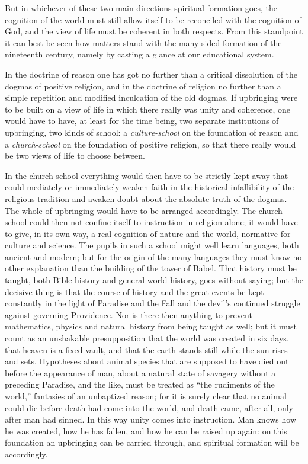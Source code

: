\documentclass[12pt,a4paper,openany]{book}
\newcommand{\opage}[1]{\marginnote{\footnotesize\textit{[#1]}}}
\begin{document}
But in whichever of these two main directions spiritual formation goes,
the cognition of the world must still allow itself to be reconciled with
the cognition of God, and the view of life must be coherent in both
respects. From this standpoint it can best be seen how matters stand with
the many-sided formation of the nineteenth century, namely by casting a
glance at our educational system.

In the doctrine of reason one has got no further than a critical
dissolution of the dogmas of positive religion, and in the doctrine of
religion no further than a simple repetition and modified inculcation of
the old dogmas. If upbringing were to be built on a view of life in which
there really was unity and coherence, one would have to have, at least
for the time being, two separate institutions of upbringing, two kinds of
school: a \emph{culture-school} on the foundation of reason and a
\emph{church-school} on the foundation of positive religion, so that
there really would be two views of life to choose between.

In the church-school everything would then have to be strictly kept away
that could mediately or immediately weaken faith in the historical
infallibility of the religious tradition and awaken doubt about the
absolute truth of the dogmas. The whole of upbringing would have to be
arranged accordingly. The church-school could then not confine itself to
instruction in religion alone; it would have to give, in its own way, a
real cognition of nature and the world, normative for culture and
science. The pupils in such a school \opage{8}might well learn languages, both
ancient and modern; but for the origin of the many languages they must
know no other explanation than the building of the tower of Babel. That
history must be taught, both Bible history and general world history,
goes without saying; but the decisive thing is that the course of history
and the great events be kept constantly in the light of Paradise and the
Fall and the devil's continued struggle against governing Providence. Nor
is there then anything to prevent mathematics, physics and natural
history from being taught as well; but it must count as an unshakable
presupposition that the world was created in six days, that heaven is a
fixed vault, and that the earth stands still while the sun rises and
sets. Hypotheses about animal species that are supposed to have died out
before the appearance of man, about a natural state of savagery without a
preceding Paradise, and the like, must be treated as ``the rudiments of
the world,'' fantasies of an unbaptized reason; for it is surely clear
that no animal could die before death had come into the world, and death
came, after all, only after man had sinned. In this way unity comes into
instruction. Man knows how he was created, how he has fallen, and how he
can be raised up again: on this foundation an upbringing can be carried
through, and spiritual formation will be accordingly.
\end{document}
